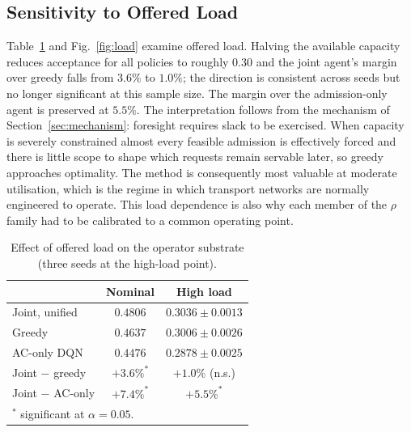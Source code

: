 \documentclass[10pt,journal,comsoc]{IEEEtran}
\begin{document}
\subsection{Sensitivity to Offered Load}
\label{sec:load}
Table~\ref{tab:load} and Fig.~\ref{fig:load} examine offered load. Halving
the available capacity reduces acceptance for all policies to roughly
$0.30$ and the joint agent's margin over greedy falls from $3.6\%$ to
$1.0\%$; the direction is consistent across seeds but no longer
significant at this sample size. The margin over the admission-only agent
is preserved at $5.5\%$. The interpretation follows from the mechanism of
Section~\ref{sec:mechanism}: foresight requires slack to be exercised.
When capacity is severely constrained almost every feasible admission is
effectively forced and there is little scope to shape which requests
remain servable later, so greedy approaches optimality. The method is
consequently most valuable at moderate utilisation, which is the regime in
which transport networks are normally engineered to operate. This load
dependence is also why each member of the $\rho$ family had to be
calibrated to a common operating point.

\begin{table}[t]
\centering
\caption{Effect of offered load on the operator substrate (three seeds at
the high-load point).}
\label{tab:load}
\renewcommand{\arraystretch}{1.2}
\begin{tabular}{lcc}
\toprule
& \textbf{Nominal} & \textbf{High load} \\
\midrule
Joint, unified      & $0.4806$ & $0.3036 \pm 0.0013$ \\
Greedy              & $0.4637$ & $0.3006 \pm 0.0026$ \\
AC-only DQN         & $0.4476$ & $0.2878 \pm 0.0025$ \\
\midrule
Joint $-$ greedy    & $+3.6\%^{*}$ & $+1.0\%$ (n.s.) \\
Joint $-$ AC-only   & $+7.4\%^{*}$ & $+5.5\%^{*}$ \\
\bottomrule
\multicolumn{3}{l}{\footnotesize $^{*}$ significant at $\alpha=0.05$.}
\end{tabular}
\end{table}
\end{document}
